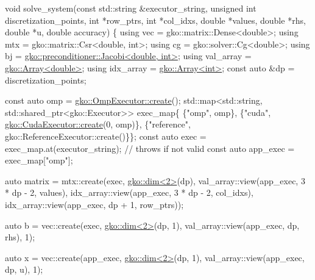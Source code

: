 \begin{DoxyCodeInclude}
\textcolor{keywordtype}{void} solve\_system(\textcolor{keyword}{const} std::string &executor\_string,
                  \textcolor{keywordtype}{unsigned} \textcolor{keywordtype}{int} discretization\_points, \textcolor{keywordtype}{int} *row\_ptrs,
                  \textcolor{keywordtype}{int} *col\_idxs, \textcolor{keywordtype}{double} *values, \textcolor{keywordtype}{double} *rhs, \textcolor{keywordtype}{double} *u,
                  \textcolor{keywordtype}{double} accuracy)
\{
    \textcolor{keyword}{using} vec = gko::matrix::Dense<double>;
    \textcolor{keyword}{using} mtx = gko::matrix::Csr<double, int>;
    \textcolor{keyword}{using} cg = gko::solver::Cg<double>;
    \textcolor{keyword}{using} bj = \hyperlink{classgko_1_1preconditioner_1_1Jacobi}{gko::preconditioner::Jacobi<double, int>};
    \textcolor{keyword}{using} val\_array = \hyperlink{classgko_1_1Array}{gko::Array<double>};
    \textcolor{keyword}{using} idx\_array = \hyperlink{classgko_1_1Array}{gko::Array<int>};
    \textcolor{keyword}{const} \textcolor{keyword}{auto} &dp = discretization\_points;

    \textcolor{keyword}{const} \textcolor{keyword}{auto} omp = \hyperlink{classgko_1_1OmpExecutor_a33ca05fdd0fc928ee262fc9425304874}{gko::OmpExecutor::create}();
    std::map<std::string, std::shared\_ptr<gko::Executor>> exec\_map\{
        \{\textcolor{stringliteral}{"omp"}, omp\},
        \{\textcolor{stringliteral}{"cuda"}, \hyperlink{classgko_1_1CudaExecutor_a2718a92034350650ef406ffdb60db090}{gko::CudaExecutor::create}(0, omp)\},
        \{\textcolor{stringliteral}{"reference"}, gko::ReferenceExecutor::create()\}\};
    \textcolor{keyword}{const} \textcolor{keyword}{auto} exec = exec\_map.at(executor\_string);  \textcolor{comment}{// throws if not valid}
    \textcolor{keyword}{const} \textcolor{keyword}{auto} app\_exec = exec\_map[\textcolor{stringliteral}{"omp"}];


    \textcolor{keyword}{auto} matrix = mtx::create(exec, \hyperlink{structgko_1_1dim}{gko::dim<2>}(dp),
                              val\_array::view(app\_exec, 3 * dp - 2, values),
                              idx\_array::view(app\_exec, 3 * dp - 2, col\_idxs),
                              idx\_array::view(app\_exec, dp + 1, row\_ptrs));

    \textcolor{keyword}{auto} b = vec::create(exec, \hyperlink{structgko_1_1dim}{gko::dim<2>}(dp, 1),
                         val\_array::view(app\_exec, dp, rhs), 1);

    \textcolor{keyword}{auto} x = vec::create(app\_exec, \hyperlink{structgko_1_1dim}{gko::dim<2>}(dp, 1),
                         val\_array::view(app\_exec, dp, u), 1);


\end{DoxyCodeInclude}
